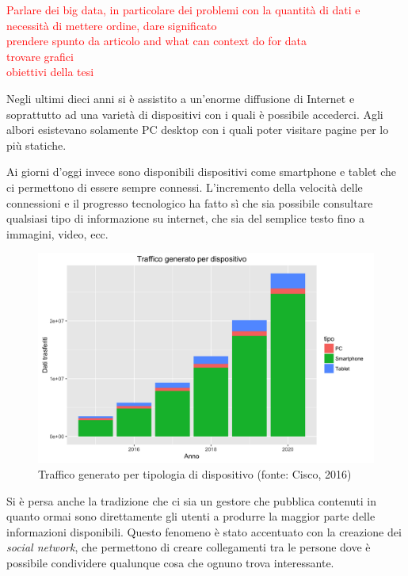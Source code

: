 \textcolor{red}{Parlare dei big data, in particolare dei problemi con la quantità di dati e necessità di mettere ordine, dare significato\\
	prendere spunto da articolo and what can context do for data\\
	trovare grafici\\
	obiettivi della tesi}

Negli ultimi dieci anni si è assistito a un'enorme diffusione di Internet e soprattutto ad una varietà di dispositivi con i quali è possibile accederci. Agli albori esistevano solamente PC desktop con i quali poter visitare pagine per lo più statiche.

Ai giorni d'oggi invece sono disponibili dispositivi come smartphone e tablet che ci permettono di essere sempre connessi. L'incremento della velocità delle connessioni e il progresso tecnologico ha fatto sì che sia possibile consultare qualsiasi tipo di informazione su internet, che sia del semplice testo fino a immagini, video, ecc.

\begin{figure}[ht]
	\centering
	\includegraphics[width=\textwidth]{1-introduzione/immagini/traffico-dispositivi.png}
	\caption[Traffico generato per tipologia di dispositivo]{Traffico generato per tipologia di dispositivo (fonte: Cisco, 2016)\label{fig:traffico-tipologia-dispositivo}}
\end{figure}

Si è persa anche la tradizione che ci sia un gestore che pubblica contenuti in quanto ormai sono direttamente gli utenti a produrre la maggior parte delle informazioni disponibili. Questo fenomeno è stato accentuato con la creazione dei \emph{social network}, che permettono di creare collegamenti tra le persone dove è possibile condividere qualunque cosa che ognuno trova interessante.

